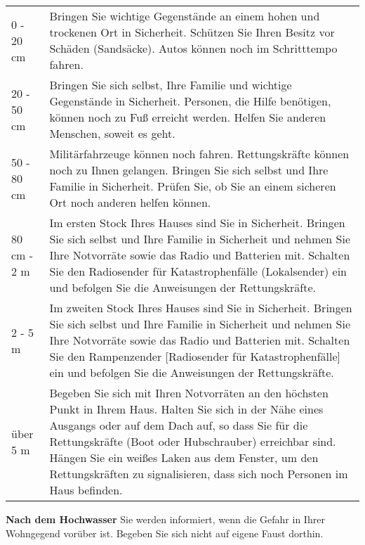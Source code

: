 \begin{tabular}[]{l p{10cm}}
0 - 20 cm &
Bringen Sie wichtige Gegenstände an einem hohen und trockenen Ort in Sicherheit. 
\newline Schützen Sie Ihren Besitz vor Schäden (Sandsäcke).
\newline Autos können noch im Schritttempo fahren. 
\newline\\ 
20 - 50 cm &
Bringen Sie sich selbst, Ihre Familie und wichtige Gegenstände in Sicherheit.
\newline Personen, die Hilfe benötigen, können noch zu Fuß erreicht werden. Helfen Sie anderen Menschen, soweit es geht.
\newline\\
50 - 80 cm &
Militärfahrzeuge können noch fahren. Rettungskräfte können noch zu Ihnen gelangen.
\newline Bringen Sie sich selbst und Ihre Familie in Sicherheit.
\newline Prüfen Sie, ob Sie an einem sicheren Ort noch anderen helfen können.
\newline\\
80 cm - 2 m &
Im ersten Stock Ihres Hauses sind Sie in Sicherheit.
\newline Bringen Sie sich selbst und Ihre Familie in Sicherheit und nehmen Sie Ihre Notvorräte sowie das Radio und Batterien mit.
\newline Schalten Sie den Radiosender für Katastrophenfälle (Lokalsender) ein und befolgen Sie die Anweisungen der Rettungskräfte.
\newline\\
2 - 5 m &
Im zweiten Stock Ihres Hauses sind Sie in Sicherheit.
\newline Bringen Sie sich selbst und Ihre Familie in Sicherheit und nehmen Sie Ihre Notvorräte sowie das Radio und Batterien mit.
\newline Schalten Sie den Rampenzender [Radiosender für Katastrophenfälle] ein und befolgen Sie die Anweisungen der Rettungskräfte.
\newline\\
über 5 m &
Begeben Sie sich mit Ihren Notvorräten an den höchsten Punkt in Ihrem Haus.
\newline Halten Sie sich in der Nähe eines Ausgangs oder auf dem Dach auf, so dass Sie für die Rettungskräfte (Boot oder Hubschrauber) erreichbar sind. 
\newline Hängen Sie ein weißes Laken aus dem Fenster, um den Rettungskräften zu signalisieren, dass sich noch Personen im Haus befinden.
\\
\end{tabular}
\newline\newline 
\textnormal{\newline\bfseries Nach dem Hochwasser}
\newline 
Sie werden informiert, wenn die Gefahr in Ihrer Wohngegend vorüber ist. Begeben Sie sich nicht auf eigene Faust dorthin.
\newline\newline

